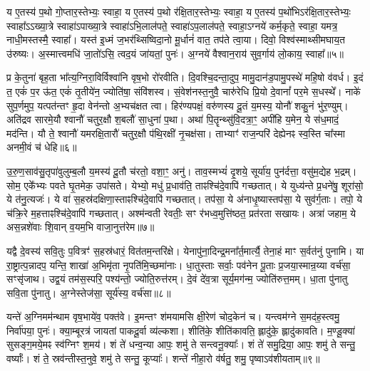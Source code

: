 य ए॒तस्य॑ प॒थो गो॒प्तार॒स्तेभ्यः॒ स्वाहा॒ य ए॒तस्य॑ प॒थो र॑क्षि॒तार॒स्तेभ्यः॒ स्वाहा॒ य ए॒तस्य॑ प॒थो॑भिऽर॑क्षि॒तार॒स्तेभ्यः॒ स्वाहा᳚ऽऽख्या॒त्रे स्वाहा॑ऽपाख्या॒त्रे स्वाहा॑ऽभि॒लाल॑पते॒ स्वाहा॑ऽप॒लाल॑पते॒ स्वाहा॒ऽग्नये॑ कर्म॒कृते॒ स्वाहा॒ यमत्र॒ नाधी॒मस्तस्मै॒ स्वाहा᳚। 
यस्त॑ इ॒ध्मं ज॒भर॑थ्सिष्विदा॒नो मू॒र्धानं॑ वात॒ तप॑ते त्वा॒या। 
दिवो॒ विश्व॑स्माथ्सीमघाय॒त उ॑रुष्यः। 
अ॒स्मात्त्वमधि॑ जा॒तो॑ऽसि॒ त्वद॒यं जा॑यतां॒ पुनः॑। 
अ॒ग्नये॑ वैश्वान॒राय॑ सुव॒र्गाय॑ लो॒काय॒ स्वाहा᳚॥५॥
\anuvakamend[य ए॒तस्य॒ त्वत्पञ्च॑]

प्र के॒तुना॑ बृह॒ता भा᳚त्य॒ग्निरा॒विर्विश्वा॑नि वृष॒भो रो॑रवीति। 
दि॒वश्चि॒दन्ता॒दुप॒ मामु॒दान॑ड॒पामु॒पस्थे॑ महि॒षो व॑वर्ध। 
इ॒दं त॒ एकं॑ प॒र ऊ॑त॒ एकं॑ तृ॒तीये॑न॒ ज्योति॑षा॒ संवि॑शस्व। 
सं॒वेश॑नस्त॒नुवै॒ चारु॑रेधि प्रि॒यो दे॒वानां᳚ पर॒मे स॒धस्थे᳚। 
नाके॑ सुप॒र्णमुप॒ यत्पत॑न्तꣳ हृ॒दा वेन॑न्तो अ॒भ्यच॑क्षत त्वा। 
हिर॑ण्यपक्षं॒ वरु॑णस्य दू॒तं य॒मस्य॒ योनौ॑ शकु॒नं भु॑र॒ण्युम्। 
अति॑द्रव सारमे॒यौ श्वानौ॑ चतुर॒क्षौ श॒बलौ॑ सा॒धुना॑ प॒था। 
अथा॑ पि॒तॄन्थ्सु॑वि॒दत्रा॒ꣳ॒ अपी॑हि य॒मेन॒ ये स॑ध॒मादं॒ मद॑न्ति। 
यौ ते॒ श्वानौ॑ यमरक्षि॒तारौ॑ चतुर॒क्षौ प॑थि॒रक्षी॑ नृ॒चक्ष॑सा। 
ताभ्याꣳ॑ राज॒न्परि॑ देह्येनꣴ स्व॒स्ति चा᳚स्मा अनमी॒वं च॑ धेहि॥६॥

उ॒रु॒ण॒साव॑सु॒तृपा॑वुलुम्ब॒लौ य॒मस्य॑ दू॒तौ च॑रतो॒ वशा॒ꣳ॒ अनु॑। 
ताव॒स्मभ्यं॑ दृ॒शये॒ सूर्या॑य॒ पुन॑र्दत्ता॒ वसु॑म॒द्येह भ॒द्रम्। 
सोम॒ एके᳚भ्यः पवते घृ॒तमेक॒ उपा॑सते। 
येभ्यो॒ मधु॑ प्र॒धाव॑ति॒ ताꣴश्चि॑दे॒वापि॑ गच्छतात्। 
ये युध्य॑न्ते प्र॒धने॑षु॒ शूरा॑सो॒ ये त॑नु॒त्यजः॑। 
ये वा॑ स॒हस्र॑दक्षिणा॒स्ताꣴश्चि॑दे॒वापि॑ गच्छतात्। 
तप॑सा॒ ये अ॑नाधृ॒ष्यास्तप॑सा॒ ये सुव॑र्ग॒ताः। 
तपो॒ ये च॑क्रि॒रे म॒हत्ताꣴश्चि॑दे॒वापि॑ गच्छतात्। 
अश्म॑न्वती रेवतीः॒ सꣳ र॑भध्व॒मुत्ति॑ष्ठत॒ प्रत॑रता सखायः। 
अत्रा॑ जहाम॒ ये अस॒न्नशे॑वाः  शि॒वान् व॒यम॒भि वाजा॒नुत्त॑रेम॥७॥

यद्वै दे॒वस्य॑ सवि॒तुः प॒वित्रꣳ॑ स॒हस्र॑धारं॒  वित॑तम॒न्तरि॑क्षे। 
येनापु॑ना॒दिन्द्र॒मना᳚र्त॒मार्त्यै॒ तेना॒हं माꣳ स॒र्वत॑नुं पुनामि। 
या रा॒ष्ट्रात्प॒न्नादप॒ यन्ति॒ शाखा॑ अ॒भिमृ॑ता नृ॒पति॑मि॒च्छमा॑नाः। 
धा॒तुस्ताः सर्वाः॒ पव॑नेन पू॒ताः प्र॒जया॒स्मान्र॒य्या वर्च॑सा॒ सꣳसृ॑जाथ। 
उद्व॒यं तम॑स॒स्परि॒ पश्य॑न्तो॒ ज्योति॒रुत्त॑रम्। 
दे॒वं दे॑व॒त्रा सूर्य॒मग॑न्म॒ ज्योति॑रुत्त॒मम्। 
धा॒ता पु॑नातु सवि॒ता पु॑नातु। 
अ॒ग्नेस्तेज॑सा॒ सूर्य॑स्य॒ वर्च॑सा॥८॥
\anuvakamend[धे॒ह्युत्त॑रेमा॒ष्टौ च॑]

यन्ते॑ अ॒ग्निमम॑न्थाम वृष॒भाये॑व॒ पक्त॑वे। 
इ॒मन्तꣳ श॑मयामसि क्षी॒रेण॑ चोद॒केन॑ च। 
यन्त्वम॑ग्ने स॒मद॑ह॒स्त्वमु॒ निर्वा॑पया॒ पुनः॑। 
क्या॒म्बूरत्र॑ जायतां पाकदू॒र्वा व्य॑ल्कशा। 
शीति॑के॒ शीति॑कावति॒ ह्लादु॑के॒ ह्लादु॑कावति। 
म॒ण्डू॒क्या॑ सुसङ्ग॒मये॒मꣴ स्व॑ग्निꣳ श॒मय॑। 
शं ते॑ धन्व॒न्या आपः॒ शमु॑ ते सन्त्वनू॒क्याः᳚। 
शं ते॑ समु॒द्रिया॒ आपः॒ शमु॑ ते सन्तु॒ वर्ष्याः᳚। 
शं ते॒ स्रव॑न्तीस्त॒नुवे॒ शमु॑ ते सन्तु॒ कूप्याः᳚। 
शन्ते॑ नीहा॒रो व॑र्\mbox{}षतु॒ शमु॒ पृष्वाऽव॑शीयताम्॥९॥

